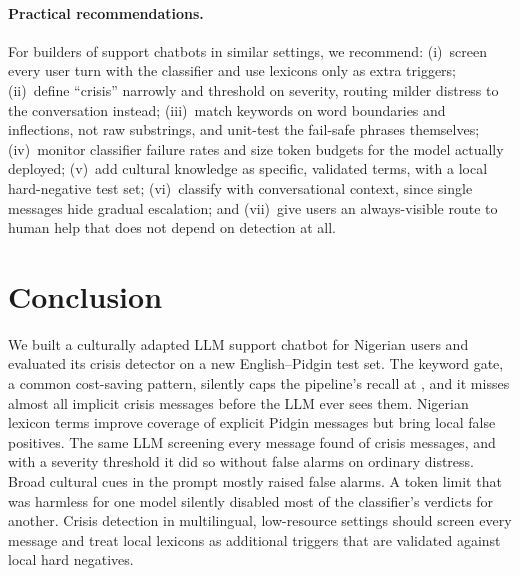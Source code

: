 \paragraph{Practical recommendations.} For builders of support chatbots in similar settings, we recommend:
(i)~screen every user turn with the classifier and use lexicons only as extra triggers;
(ii)~define ``crisis'' narrowly and threshold on severity, routing milder distress to the conversation instead;
(iii)~match keywords on word boundaries and inflections, not raw substrings, and unit-test the fail-safe phrases themselves;
(iv)~monitor classifier failure rates and size token budgets for the model actually deployed;
(v)~add cultural knowledge as specific, validated terms, with a local hard-negative test set;
(vi)~classify with conversational context, since single messages hide gradual escalation; and
(vii)~give users an always-visible route to human help that does not depend on detection at all.

\section{Conclusion}
We built a culturally adapted LLM support chatbot for Nigerian users and evaluated its crisis detector on a new English--Pidgin test set. The keyword gate, a common cost-saving pattern, silently caps the pipeline's recall at \KWfullR, and it misses almost all implicit crisis messages before the LLM ever sees them. Nigerian lexicon terms improve coverage of explicit Pidgin messages but bring local false positives. The same LLM screening every message found  of crisis messages, and with a severity threshold it did so without false alarms on ordinary distress. Broad cultural cues in the prompt mostly raised false alarms. A token limit that was harmless for one model silently disabled most of the classifier's verdicts for another. Crisis detection in multilingual, low-resource settings should screen every message and treat local lexicons as additional triggers that are validated against local hard negatives.

